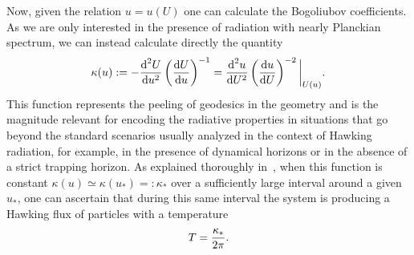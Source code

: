 \documentclass[11pt,a4paper]{article}
\newcommand{\diff}{\text{d}}
\begin{document}
Now, given the relation $u=u(U)$ one can calculate the Bogoliubov coefficients. As we are only interested in the presence of radiation with nearly Planckian spectrum, we can instead calculate directly the quantity~\cite{barcelo-min,barcelo-gen}
%
\begin{equation}
\kappa (u) := -{\diff^2 U \over \diff u^2} \left({\diff U \over \diff u} \right)^{-1}={\diff^2 u \over \diff U^2} \left({\diff u \over \diff U} \right)^{-2}\bigg|_{U(u)}.
\end{equation}
%
This function represents the peeling of geodesics in the geometry and 
is the magnitude relevant for encoding the radiative properties in 
situations that go beyond the standard scenarios usually analyzed in the 
context of Hawking radiation, for example, in the presence of dynamical 
horizons or in the absence of a strict trapping horizon. As explained thoroughly in~\cite{barcelo-min,barcelo-gen}, when this function is constant $\kappa(u) \simeq \kappa (u_*)=:\kappa_*$ over a sufficiently large interval around a given $u_*$, one can ascertain that during this same interval the system is producing a Hawking flux of particles with a temperature
%
\begin{equation}
 T = {\kappa_* \over 2\pi}.
\label{hawking.temperature}
\end{equation}
%
\end{document}
